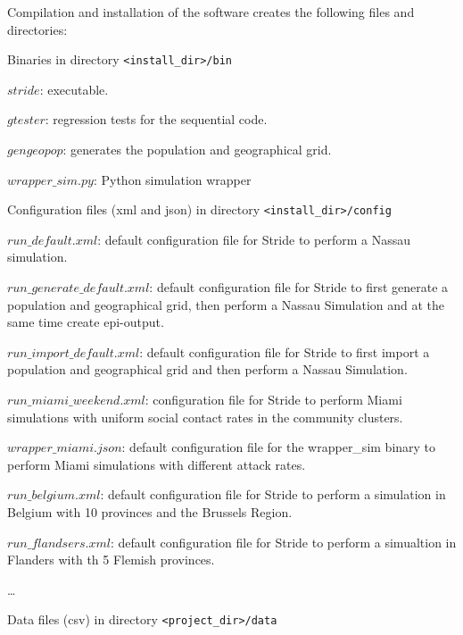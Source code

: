 Compilation and installation of the software creates the following files and directories:
\begin{compactitem}
%
	\item Binaries in directory \texttt{<install\_dir>/bin}
      		\begin{compactitem}
        			\item $stride$: executable.
        			\item $gtester$: regression tests for the sequential code.
               	 \item $gengeopop$: generates the population and geographical grid.
        			\item $wrapper\_sim.py$: Python simulation wrapper
        	\end{compactitem}
%
    \item Configuration files (xml and json) in directory \texttt{<install\_dir>/config}
      	\begin{compactitem}
			\item $run\_default.xml$: default configuration file for Stride to perform a Nassau simulation.
        		\item $run\_generate\_default.xml$: default configuration file for Stride to first generate a population and geographical grid, then perform a Nassau Simulation and at the same time create epi-output.
       		\item $run\_import\_default.xml$: default configuration file for Stride to first import a population and geographical grid and then perform a Nassau Simulation.
        		\item $run\_miami\_weekend.xml$: configuration file for Stride to perform Miami simulations with uniform social contact rates in the community clusters.
			\item $wrapper\_miami.json$: default configuration file for the wrapper\_sim binary to perform Miami simulations with different attack rates.
			\item $run\_belgium.xml$: default configuration file for Stride to perform a simulation in Belgium with 10 provinces and the Brussels Region.
			\item $run\_flandsers.xml$: default configuration file for Stride to perform a simualtion in Flanders with th 5 Flemish provinces.
        		\item \ldots
        \end{compactitem}
%        
    \item Data files (csv) in directory \texttt{<project\_dir>/data}
      	\begin{compactitem}

\end{compactitem}
\end{compactitem}
